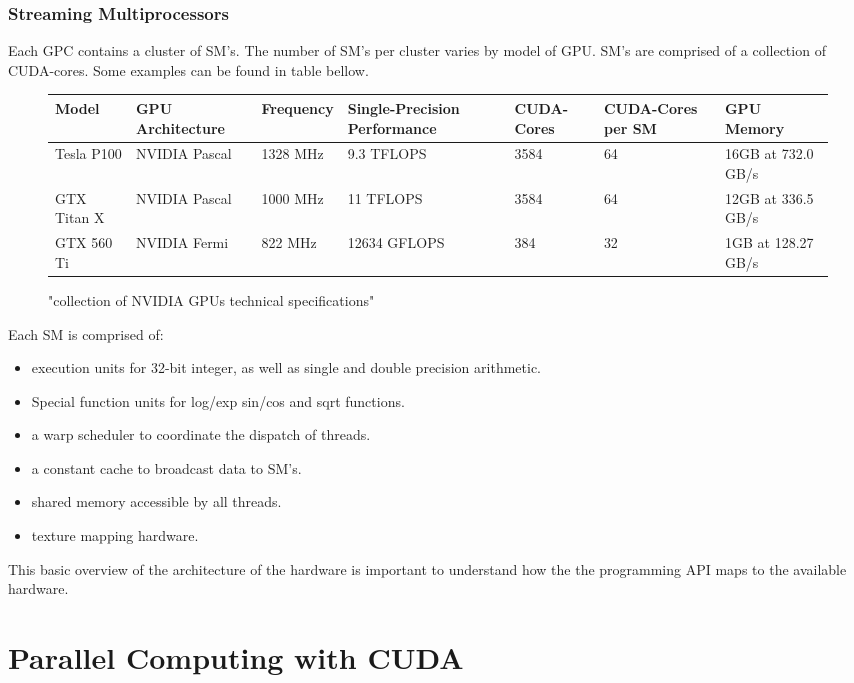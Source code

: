 \subsubsection{Streaming Multiprocessors}
Each GPC contains a cluster of SM's.  The number of SM's per cluster varies by
model of GPU. SM's are comprised of a collection of CUDA-cores.  Some examples
 can be found in table bellow.
\begin{figure}[htb!]
\caption{"collection of NVIDIA \Glspl{GPU} technical specifications"}
\begin{center}\label{hardwareTable}
\begin{tabu} to 0.9\textwidth { | X[l] | X[c] | X[c] | X[c]| X[c]| X[c]| X[r] | }

 \hline
 Model & GPU Architecture &Frequency& Single-Precision Performance & CUDA-Cores & CUDA-Cores per SM & GPU Memory \\
 \hline
 Tesla P100 & NVIDIA Pascal &1328 MHz &9.3 TFLOPS & 3584 & 64 & 16GB at 732.0 GB/s\\
 \hline
 GTX Titan X & NVIDIA Pascal & 1000 MHz & 11 TFLOPS & 3584 & 64 & 12GB at 336.5 GB/s\\
 \hline
 GTX 560 Ti & NVIDIA Fermi & 822 MHz&12634 GFLOPS & 384 & 32  & 1GB at 128.27 GB/s\\
\hline
\end{tabu}
\end{center}

\end{figure}
Each SM is comprised of: \cite{Wilt}
\begin{itemize}
  \item execution units for 32-bit integer, as well as single and double precision arithmetic.
  \item Special function units for log/exp sin/cos and sqrt functions.
  \item a warp scheduler to coordinate the dispatch of threads.
  \item a constant cache to broadcast data to SM's.
  \item shared memory accessible by all threads.
  \item texture mapping hardware.
\end{itemize}

This basic overview of the architecture of the hardware is important to understand
how the the programming API maps to the available hardware.


\section{Parallel Computing with CUDA}
